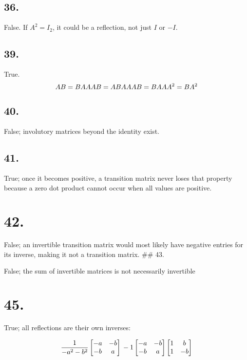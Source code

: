 \documentclass[]{article}
\newcommand{\m}[1]{\begin{bmatrix}#1\end{bmatrix}}
\begin{document}
\hypertarget{section-149}{%
\subsection{36.}\label{section-149}}

False. If \(A^2=I_2\), it could be a reflection, not just \(I\) or
\(-I\).

\hypertarget{section-150}{%
\subsection{39.}\label{section-150}}

True. \[AB=BA\\
AAB=ABA\\
AAB=BAA\\
A^2=BA^2
\]

\hypertarget{section-151}{%
\subsection{40.}\label{section-151}}

False; involutory matrices beyond the identity exist.

\hypertarget{section-152}{%
\subsection{41.}\label{section-152}}

True; once it becomes positive, a transition matrix never loses that
property because a zero dot product cannot occur when all values are
positive.

\hypertarget{section-153}{%
\section{42.}\label{section-153}}

False; an invertible transition matrix would most likely have negative
entries for its inverse, making it not a transition matrix. \#\# 43.

False; the sum of invertible matrices is not necessarily invertible

\hypertarget{section-154}{%
\section{45.}\label{section-154}}

True; all reflections are their own inverses:

\[\frac{1}{-a^2-b^2}\m{-a&-b\\-b&a}\\
-1\m{-a&-b\\
-b&a}
\m{1&b\\
1&-b}\]
\end{document}
